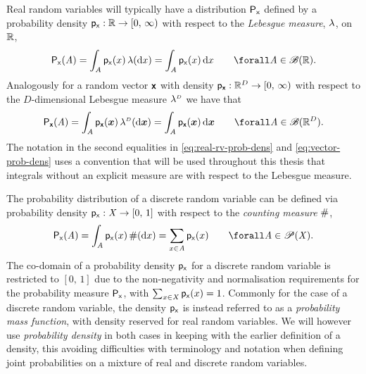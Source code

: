 Real random variables will typically have a distribution $\mathsf{P}_{\mathsf{x}}$ defined by a probability density $\mathsf{p}_{\mathsf{x}} : \mathbb{R} \to [0,\,\infty)$ with respect to the \emph{Lebesgue measure}, $\lebm{1}$, on $\mathbb{R}$,
\begin{equation}\label{eq:real-rv-prob-dens}
    \prob{\rvar{x}}(\set{A})
    = \int_{\set{A}} \pden{\rvar{x}}(x) \,\lebm{1}(\dr x)
    = \int_{\set{A}} \pden{\rvar{x}}(x) \,\dr x
    \qquad
    \forall \set{A} \in \borel(\reals).
\end{equation}
Analogously for a random vector $\boldsymbol{\mathsf{x}}$ with density $\mathsf{p}_{\boldsymbol{\mathsf{x}}} : \mathbb{R}^D \to [0,\,\infty)$ with respect to the $D$-dimensional Lebesgue measure $\lebm{D}$ we have that
\begin{equation}\label{eq:vector-prob-dens}
    \prob{\rvct{x}}(\set{A})
    = \int_{\set{A}} \pden{\rvct{x}}(\vct{x}) \,\lebm{D}(\dr \vct{x})
    = \int_{\set{A}} \pden{\rvct{x}}(\vct{x}) \,\dr \vct{x}
    \qquad
    \forall \set{A} \in \borel(\reals^D).
\end{equation}
The notation in the second equalities in \eqref{eq:real-rv-prob-dens} and \eqref{eq:vector-prob-dens} uses a convention that will be used throughout this thesis that integrals without an explicit measure are with respect to the Lebesgue measure. 

The probability distribution of a discrete random variable can be defined via probability density $\mathsf{p}_{\mathsf{x}} : \mathit{X} \to [0,\,1]$ with respect to the \emph{counting measure} $\#$,
\begin{equation}
    \prob{\rvar{x}}(\set{A})
    = \int_{\set{A}} \pden{\rvar{x}}(x) \,\countm(\dr x)
    = \sum_{x \in \set{A}} \pden{\rvar{x}}(x) 
    \qquad
    \forall \set{A} \in \powerset(\set{X}).
\end{equation}
The co-domain of a probability density $\mathsf{p}_{\mathsf{x}}$ for a discrete random variable is restricted to $[0,\,1]$ due to the non-negativity and normalisation requirements for the probability measure $\mathsf{P}_{\mathsf{x}}$, with $\sum_{x\in\mathit{X}} \mathsf{p}_{\mathsf{x}}(x) = 1$. Commonly for the case of a discrete random variable, the density $\mathsf{p}_{\mathsf{x}}$ is instead referred to as a \emph{probability mass function}, with density reserved for real random variables. We will however use \emph{probability density} in both cases in keeping with the earlier definition of a density, this avoiding difficulties with terminology and notation when defining joint probabilities on a mixture of real and discrete random variables.

